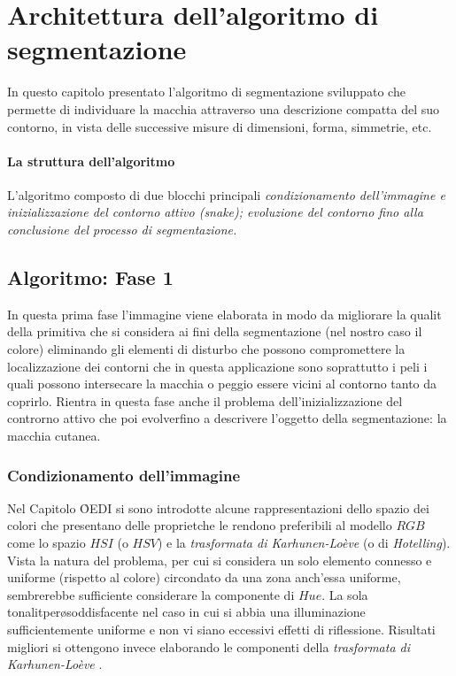 \chapter{Architettura dell'algoritmo di segmentazione}

In questo capitolo \e presentato l'algoritmo di segmentazione sviluppato che permette di
individuare la macchia attraverso una descrizione compatta del suo contorno, in vista delle
successive misure di dimensioni, forma, simmetrie, etc. 

\subsubsection{La struttura dell'algoritmo}

L'algoritmo \e composto di due blocchi principali
\ben
{\it
\im condizionamento dell'immagine e inizializzazione del contorno attivo (snake);
\im evoluzione del contorno fino alla conclusione del processo di segmentazione.
}
\een

\section{Algoritmo: Fase 1}

In questa prima fase l'immagine viene elaborata in modo da migliorare la qualit\a
della primitiva che si considera ai fini della segmentazione (nel nostro caso il colore) eliminando gli
elementi di disturbo che possono compromettere la localizzazione dei contorni che in questa applicazione
sono soprattutto i peli i quali possono intersecare la macchia o peggio essere vicini al
contorno tanto da coprirlo.
Rientra in questa fase anche il problema dell'inizializzazione del controrno attivo che
poi evolver\a fino a descrivere l'oggetto della segmentazione: la macchia cutanea.

\subsection{Condizionamento dell'immagine}

Nel Capitolo \r{OEDI} si sono introdotte alcune rappresentazioni dello spazio dei colori
che presentano delle propriet\a che le rendono preferibili al modello $RGB$ come
lo spazio $HSI$ (o $HSV$) e la {\it trasformata di Karhunen-Lo\`eve} (o di
{\it Hotelling}).
Vista la natura del problema, per cui si considera un solo elemento connesso e uniforme
(rispetto al colore) circondato da una zona anch'essa uniforme, sembrerebbe sufficiente
considerare la componente di $Hue$.
La sola tonalit\a per\o \e soddisfacente nel caso in cui si abbia una illuminazione sufficientemente
uniforme e non vi siano eccessivi effetti di riflessione.
Risultati migliori si ottengono invece elaborando le componenti della {\it trasformata di Karhunen-Lo\`eve} \cite{Lucchese} \cite{Schmid}.

